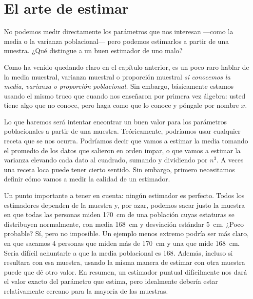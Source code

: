 \chapter{El arte de estimar}

\begin{ideanote}
No podemos medir directamente los parámetros que nos interesan —como la media o la varianza poblacional— pero podemos estimarlos a partir de una muestra. ¿Qué distingue a un buen estimador de uno malo?
\end{ideanote}

Como ha venido quedando claro en el capítulo anterior, es un poco raro hablar de la media muestral, varianza muestral o proporción muestral \emph{si conocemos la media, varianza o proporción poblacional.} Sin embargo, básicamente estamos usando el mismo truco que cuando nos enseñaron por primera vez álgebra: usted tiene algo que no conoce, pero haga como que lo conoce y póngale por nombre \(x\).

Lo que haremos será intentar encontrar un buen valor para los parámetros poblacionales a partir de una muestra. Teóricamente, podríamos usar cualquier receta que se nos ocurra. Podríamos decir que vamos a estimar la media tomando el promedio de los datos que salieron en orden impar, o que vamos a estimar la varianza elevando cada dato al cuadrado, sumando y dividiendo por \(n^3\). A veces una receta loca puede tener cierto sentido. Sin embargo, primero necesitamos definir cómo vamos a medir la calidad de un estimador. 

Un punto importante a tener en cuenta: ningún estimador es perfecto. Todos los estimadores dependen de la muestra y, por azar, podemos sacar justo la muestra en que todas las personas miden \qty{170}{\centi\meter} de una población cuyas estaturas se distribuyen normalmente, con media \qty{168}{\centi\meter} y desviación estándar \qty{5}{\centi\meter}. ¿Poco probable? Sí, pero no imposible. Un ejemplo menos extremo podría ser más claro, en que sacamos 4 personas que miden más de \qty{170}{\centi\meter} y una que mide \qty{168}{\centi\meter}. Sería difícil achuntarle a que la media poblacional es \num{168}. Además, incluso si resultara con esa muestra, usando la misma manera de estimar con otra muestra puede que dé otro valor. En resumen, un estimador puntual difícilmente nos dará el valor exacto del parámetro que estima, pero idealmente debería estar relativamente cercano para la mayoría de las muestras.

